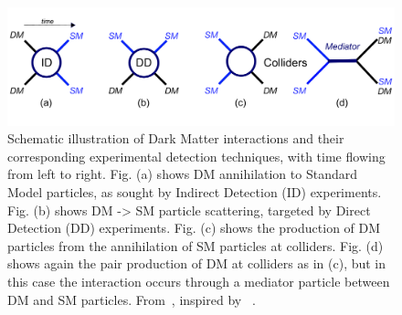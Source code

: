 


\begin{figure}[!htpb]
\includegraphics[width=\textwidth]{figures/EFTSimplifiedModels}
\caption{Schematic illustration of Dark Matter interactions and their corresponding experimental detection techniques, with time flowing from left to right. Fig. (a) shows DM annihilation to Standard Model particles, as sought by Indirect Detection (ID) experiments. Fig. (b) shows DM -> SM particle scattering, targeted by Direct Detection (DD) experiments. Fig. (c) shows the production of DM particles from the annihilation of SM particles at colliders. Fig. (d) shows again the pair production of DM at colliders as in (c), but in this case the interaction occurs through a mediator particle between DM and SM particles. From~\cite{monoXfig}, inspired by ~\cite{Bauer:2013ihz}.}
\label{fig:Complementarity}
\end{figure}


